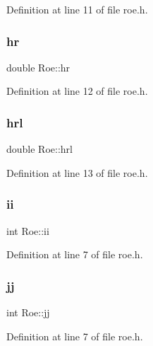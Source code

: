 Definition at line 11 of file roe.\+h.

\mbox{\label{classRoe_a835acb6a5f019b3a37b2a27367621e50}} 
\subsubsection{\texorpdfstring{hr}{hr}}
{\footnotesize\ttfamily double Roe\+::hr\hspace{0.3cm}{\ttfamily [private]}}



Definition at line 12 of file roe.\+h.

\mbox{\label{classRoe_a94bffa136d267cf6d55ea8a733f0de5d}} 
\subsubsection{\texorpdfstring{hrl}{hrl}}
{\footnotesize\ttfamily double Roe\+::hrl\hspace{0.3cm}{\ttfamily [private]}}



Definition at line 13 of file roe.\+h.

\mbox{\label{classRoe_ae1d4f32b4c3d8e5d9d1225bec139fb71}} 
\subsubsection{\texorpdfstring{ii}{ii}}
{\footnotesize\ttfamily int Roe\+::ii\hspace{0.3cm}{\ttfamily [private]}}



Definition at line 7 of file roe.\+h.

\mbox{\label{classRoe_a925c5191227cccf071e6e0b0ac198c67}} 
\subsubsection{\texorpdfstring{jj}{jj}}
{\footnotesize\ttfamily int Roe\+::jj\hspace{0.3cm}{\ttfamily [private]}}



Definition at line 7 of file roe.\+h.

